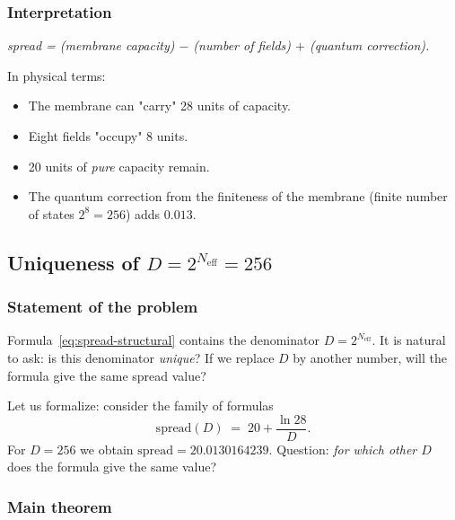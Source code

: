 \documentclass[11pt,a4paper]{article}
\theoremstyle{definition}
\begin{document}
\subsubsection{Interpretation}

\begin{center}
\emph{spread = (membrane capacity) $-$ (number of fields)
$+$ (quantum correction).}
\end{center}

\medskip\noindent
In physical terms:
\begin{itemize}
    \item The membrane can "carry" 28 units of capacity.
    \item Eight fields "occupy" 8 units.
    \item 20 units of \emph{pure} capacity remain.
    \item The quantum correction from the finiteness of the membrane
          (finite number of states $2^8 = 256$) adds
          $0.013$.
\end{itemize}

\subsection{Uniqueness of \texorpdfstring{$D = 2^{N_{\text{eff}}} = 256$}{D = 2\^{}N\_eff = 256}}
\label{subsec:spread-uniqueness}

\subsubsection{Statement of the problem}

Formula~\eqref{eq:spread-structural} contains the denominator
$D = 2^{N_{\text{eff}}}$. It is natural to ask: is this denominator
\emph{unique}? If we replace $D$ by another number,
will the formula give the same spread value?

\medskip\noindent
Let us formalize: consider the family of formulas
\begin{equation}
    \text{spread}(D) \;=\; 20 + \frac{\ln 28}{D}.
    \label{eq:spread-family}
\end{equation}
For $D = 256$ we obtain $\text{spread} = 20.0130164239$.
Question: \emph{for which other $D$} does the formula give the same value?

\subsubsection{Main theorem}
\end{document}

